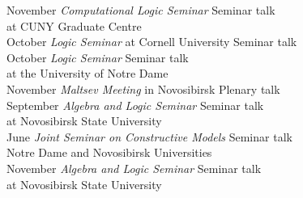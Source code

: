 \documentclass[12pt]{article}
\begin{document}
\begin{tabbing}
{November		\> {\em Computational Logic Seminar}		\> Seminar talk\\
		\>	\> at CUNY Graduate Centre			\> \\
October			\> {\em Logic Seminar} at Cornell University	\> Seminar talk\\
October			\> {\em Logic Seminar}				\> Seminar talk\\
		\>	\> at the University of Notre Dame		\> \\
November		\> {\em Maltsev Meeting} in Novosibirsk		\> Plenary talk\\
September		\> {\em Algebra and Logic Seminar}		\> Seminar talk\\
		\>	\> at Novosibirsk State University		\> \\
June			\> {\em Joint Seminar on Constructive Models}	\> Seminar talk\\
		\>	\> Notre Dame and Novosibirsk Universities	\> \\
November		\> {\em Algebra and Logic Seminar}		\> Seminar talk\\
		\>	\> at Novosibirsk State University		\>
}{}
\end{tabbing}
\end{document}

